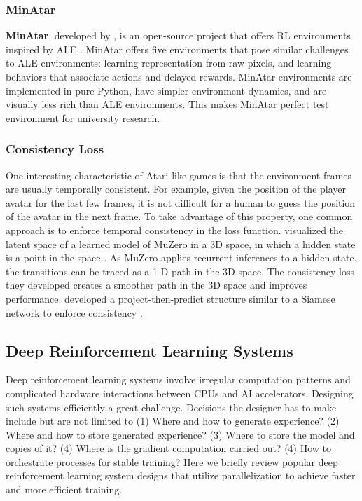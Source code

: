 \subsubsection{MinAtar} \label{sec:min_atar}
\textbf{MinAtar}, developed by \citeauthor{MinAtarAtariInspiredTestbed_Young.Tian_2019}, is an open-source project that offers RL environments inspired by ALE \cite{MinAtarAtariInspiredTestbed_Young.Tian_2019}.
MinAtar offers five environments that pose similar challenges to ALE environments: learning representation from raw pixels, and learning behaviors that associate actions and delayed rewards.
MinAtar environments are implemented in pure Python, have simpler environment dynamics, and are visually less rich than ALE environments.
This makes MinAtar perfect test environment for university research.

\subsubsection{Consistency Loss}
One interesting characteristic of Atari-like games is that the environment frames are usually temporally consistent.
For example, given the position of the player avatar for the last few frames, it is not difficult for a human to guess the position of the avatar in the next frame.
To take advantage of this property, one common approach is to enforce temporal consistency in the loss function.
 visualized the latent space of a learned model of MuZero in a 3D space, in which a hidden state is a point in the space \cite{VisualizingMuZeroModels_deVries.Voskuil.ea_2021}.
As MuZero applies recurrent inferences to a hidden state, the transitions can be traced as a 1-D path in the 3D space.
The consistency loss they developed creates a smoother path in the 3D space and improves performance.
 developed a project-then-predict structure similar to a Siamese network to enforce consistency \cite{MasteringAtariGames_Ye.Liu.ea_2021,SiameseNeuralNetworks_Koch.Zemel.ea_}.

\subsection{Deep Reinforcement Learning Systems} \label{sec:drl_systems}
Deep reinforcement learning systems involve irregular computation patterns and complicated hardware interactions between CPUs and AI accelerators.
Designing such systems efficiently a great challenge.
Decisions the designer has to make include but are not limited to (1) Where and how to generate experience? (2) Where and how to store generated experience? (3) Where to store the model and copies of it? (4) Where is the gradient computation carried out? (4) How to orchestrate processes for stable training?
Here we briefly review popular deep reinforcement learning system designs that utilize parallelization to achieve faster and more efficient training.

